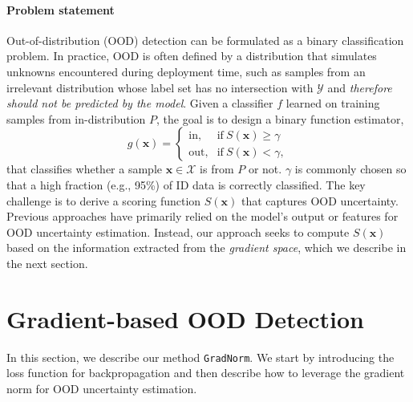 \documentclass{article}
\newcommand{\SL}[1]{{\color{blue}[\textbf{Sharon}: #1]}}
\def\*#1{\mathbf{#1}}
\begin{document}
\vspace{-0.2cm}
\paragraph{Problem statement}
Out-of-distribution (OOD) detection can be formulated as a binary classification problem. In practice, OOD is often defined by a distribution that simulates unknowns encountered during deployment time, such as samples from an irrelevant distribution whose label set has no intersection with $\mathcal{Y}$ and \emph{therefore should not be predicted by the model}.  Given a classifier $f$ learned on training samples from in-distribution $P$, the goal is to design a binary function estimator,
\begin{equation*}
    g(\*x) = 
    \begin{cases}
    \text{in}, &\text{if}\ S(\*x) \geq \gamma \\
    \text{out}, &\text{if}\ S(\*x) < \gamma,
    \end{cases}
\end{equation*}
that classifies whether a sample $\*x\in \mathcal{X}$ is from $P$ or not. $\gamma$ is commonly chosen so that a high fraction (e.g., 95\%) of ID data is correctly classified. The key challenge is to derive a scoring function $S(\*x)$ that captures OOD uncertainty. Previous approaches have primarily relied on the model's output or features for OOD uncertainty estimation. Instead, our approach seeks to compute $S(\*x)$ based on the information extracted from the \emph{gradient space}, which we describe in the next section.




\section{Gradient-based OOD Detection}
\label{sec:method}

In this section, we describe our  method \texttt{GradNorm}. We start by introducing the loss function for backpropagation and then describe how to leverage the gradient norm for OOD uncertainty estimation.

\end{document}
